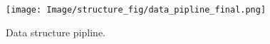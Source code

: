 \begin{figure}
  \centering
  \texttt{[image: Image/structure\_fig/data\_pipline\_final.png]}
  \caption{Data structure pipline.}
  \label{fig:data_pipline}
\end{figure}